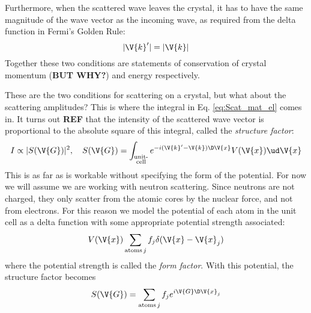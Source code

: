 \documentclass[main.tex]{subfiles}
\begin{document}
	Furthermore, when the scattered wave leaves the crystal, it has to have the same magnitude of the wave vector as the incoming wave, as required from the delta function in Fermi's Golden Rule:
	\begin{equation}\label{eq:Scat_E_cons}
		|\V{k}'| = |\V{k}|
	\end{equation}
	Together these two conditions are statements of conservation of crystal momentum (\textbf{BUT WHY?}) and energy respectively.
	
	These are the two conditions for scattering on a crystal, but what about the scattering amplitudes? This is where the integral in Eq. \eqref{eq:Scat_mat_el} comes in. It turns out \textbf{REF} that the intensity of the scattered wave vector is proportional to the absolute square of this integral, called the \textit{structure factor}:
	\begin{equation}\label{key}
		I \propto |S(\V{G})|^2, \quad S(\V{G}) = \int_{\substack{\text{unit-} \\\text{cell}}} e^{-i (\V{k}'-\V{k}) \D \V{x}} V(\V{x}) \ud \V{x}
	\end{equation}
	This is as far as is workable without specifying the form of the potential. For now we will assume we are working with neutron scattering. Since neutrons are not charged, they only scatter from the atomic cores by the nuclear force, and not from electrons. For this reason we model the potential of each atom in the unit cell as a delta function with some appropriate potential strength associated:
	\begin{equation}\label{key}
		V(\V{x}) \sum_{\text{atoms} \,j} f_j \delta(\V{x}-\V{x}_j)
	\end{equation}
	where the potential strength is called the \textit{form factor}. With this potential, the structure factor becomes
	\begin{equation}\label{key}
		S(\V{G}) = \sum_{\text{atoms} \,j} f_j e^{i \V{G} \D \V{x}_j}
	\end{equation}
\end{document}
